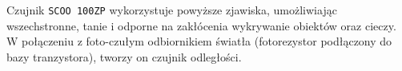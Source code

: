 \documentclass[11pt, a4paper]{article}
\begin{document}
\vspace{0.75cm}


Czujnik \texttt{SCOO 100ZP} wykorzystuje powyższe zjawiska, umożliwiając wszechstronne, tanie i odporne na zakłócenia wykrywanie obiektów oraz cieczy. W połączeniu z foto-czułym odbiornikiem światła (fotorezystor podłączony do bazy tranzystora), tworzy on czujnik odległości.
\end{document}

